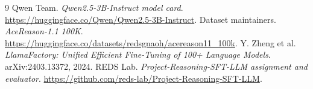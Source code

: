 \documentclass[10pt,letterpaper]{article}
\begin{document}
\begin{thebibliography}{9}\small
{} Qwen Team. \emph{Qwen2.5-3B-Instruct model card}. \url{https://huggingface.co/Qwen/Qwen2.5-3B-Instruct}.
 Dataset maintainers. \emph{AceReason-1.1 100K}. \url{https://huggingface.co/datasets/redsgnaoh/acereason11_100k}.
 Y. Zheng et al. \emph{LlamaFactory: Unified Efficient Fine-Tuning of 100+ Language Models}. arXiv:2403.13372, 2024.
 REDS Lab. \emph{Project-Reasoning-SFT-LLM assignment and evaluator}. \url{https://github.com/reds-lab/Project-Reasoning-SFT-LLM}.
\end{thebibliography}
\end{document}
